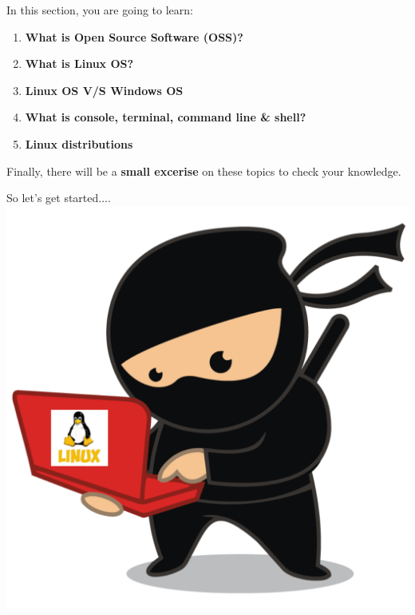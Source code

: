 \setlength{\columnsep}{3pt}
\begin{flushleft}
	\bigskip
	\bigskip
	\begin{tcolorbox}[breakable,notitle,boxrule=1pt,colback=black,colframe=black]
		\color{white}
		\bigskip
		In this section, you are going to learn:
		\begin{enumerate}
			\item \textbf{What is Open Source Software (OSS)?}
			\item \textbf{What is Linux OS?}
			\item \textbf{Linux OS V/S Windows OS}
			\item \textbf{What is console, terminal, command line \& shell?}
			\item \textbf{Linux distributions}
		\end{enumerate}	
		Finally, there will be a \textbf{small excerise} on these topics to check your knowledge.
		\bigskip
	\end{tcolorbox}
	\bigskip
	\bigskip
	\begin{multicols}{2}
		\vspace*{\fill}
		\vspace*{\fill}
		\vspace*{\fill}
		\vspace*{\fill}
		\vspace*{\fill}
		\vspace*{\fill}
		\vfill \null
		\columnbreak
		So let's get started....
		\includegraphics[scale=0.07]{content/linux_section.png}
	\end{multicols}
\end{flushleft}
\newpage
